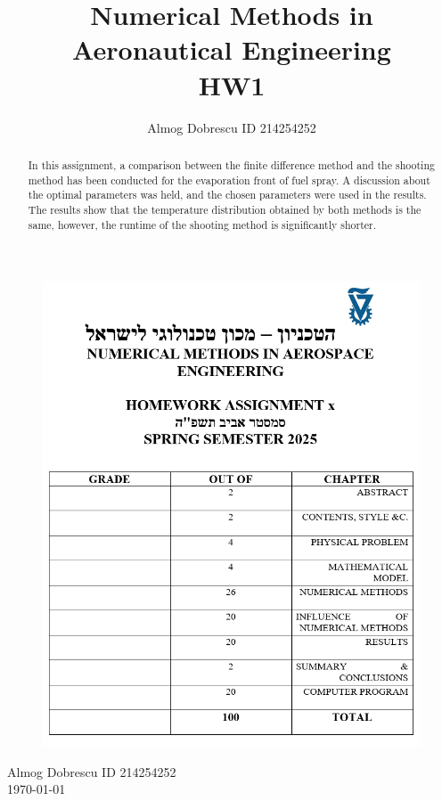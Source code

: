 \documentclass[11pt, a4paper]{article}
\title{Numerical Methods in Aeronautical Engineering \\ HW1}
\author{Almog Dobrescu ID 214254252}
\begin{document}
\thispagestyle{empty}
\begin{figure}[H]
    \centering
    \includegraphics[width=\textwidth]{./../../../Cover page for computational assignments 2025.png}
    \label{fig: cover page}
\end{figure}
\begin{center}
    \Huge
    Almog Dobrescu \qquad ID 214254252 \\ \vspace{0.5cm}
    \today
\end{center}
\newpage

\begin{abstract}
    In this assignment, a comparison between the finite difference method and the shooting method has been conducted for the evaporation front of fuel spray. A discussion about the optimal parameters was held, and the chosen parameters were used in the results. The results show that the temperature distribution obtained by both methods is the same, however, the runtime of the shooting method is significantly shorter.
\end{abstract}
\end{document}

